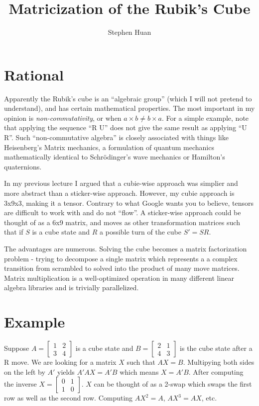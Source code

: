 \documentclass[11pt, oneside]{article}
\title{Matricization of the Rubik's Cube}
\author{Stephen Huan}
\begin{document}
\maketitle

\section{Rational}
Apparently the Rubik's cube is an ``algebraic group'' (which I will not pretend to understand), and has certain mathematical properties.
The most important in my opinion is \textit{non-commutativity}, or when \( a \times b \neq b \times a \). For a simple example, note that
applying the sequence ``R U'' does not give the same result as applying ``U R''. Such ``non-commutative algebra'' is closely
associated with things like Heisenberg's Matrix mechanics, a formulation of quantum mechanics mathematically identical to Schrödinger's wave mechanics or
Hamilton's quaternions.

In my previous lecture I argued that a cubie-wise approach was simplier and more abstract than a sticker-wise approach. However, my cubie approach is
3x9x3, making it a tensor. Contrary to what Google wants you to believe, tensors are difficult to work with and do not ``flow''. A sticker-wise approach
could be thought of as a 6x9 matrix, and moves as other transformation matrices such that if \( S \) is a cube state and \( R \) a possible turn of the cube
\( S' = S R \).

The advantages are numerous. Solving the cube becomes a matrix factorization problem - trying to decompose a single matrix which represents a
a complex transition from scrambled to solved into the product of many move matrices. Matrix multiplication is a well-optimized operation in
many different linear algebra libraries and is trivially parallelized.

\section{Example}

Suppose \( A = \begin{bmatrix} 1 & 2 \\ 3 & 4 \end{bmatrix} \) is a cube state and \( B = \begin{bmatrix} 2 & 1 \\ 4 & 3 \end{bmatrix} \)
is the cube state after a R move. We are looking for a matrix \( X \) such that \( A X = B \). Multipying both sides on the left by \( A' \) yields
\( A' A X = A' B \) which means \( X = A' B \). After computing the inverse \( X = \begin{bmatrix} 0 & 1 \\ 1 & 0 \end{bmatrix} \).
\( X \) can be thought of as a 2-swap which swaps the first row as well as the second row. Computing \( AX^2 = A \), \( AX^3 = AX \), etc.
\end{document}

